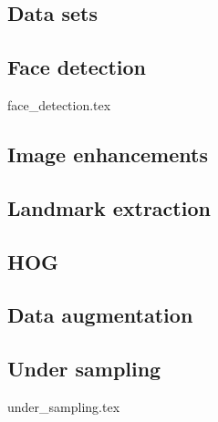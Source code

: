 \subsection{Data sets}


\subsection{Face detection}
{face_detection.tex}

\subsection{Image enhancements}


\subsection{Landmark extraction}


\subsection{HOG}


\subsection{Data augmentation}


\subsection{Under sampling}
{under_sampling.tex}